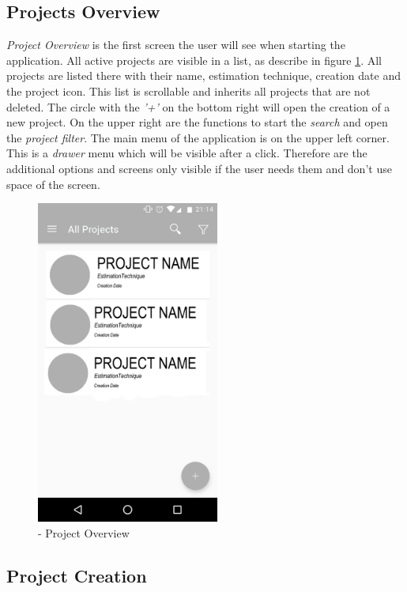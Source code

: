 \subsection{Projects Overview}

\textit{Project Overview} is the first screen the user will see when starting the application. All active projects are visible in a list, as describe in figure \ref{fig:appOverview}. All projects are listed there with their name, estimation technique, creation date and the project icon. This list is scrollable and inherits all projects that are not deleted. The circle with the \textit{'+'} on the bottom right will open the creation of a new project. On the upper right are the functions to start the \textit{search} and open the \textit{project filter}. The main menu of the application is on the upper left corner. This is a \textit{drawer} menu which will be visible after a click. Therefore are the additional options and screens only visible if the user needs them and don't use space of the screen.\newpage
\begin{figure}[h] 
	\centering 
	\includegraphics[width=6cm]{images/projectoverview.png} 
	\caption{- Project Overview} 
	\label{fig:appOverview}
\end{figure}
\subsection{Project Creation}

